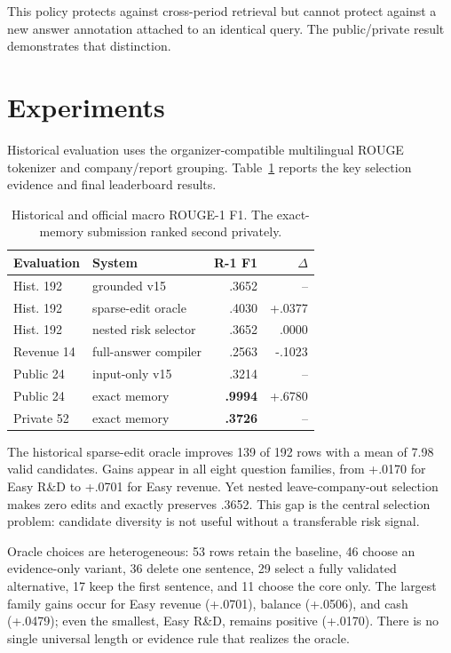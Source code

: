 \documentclass[11pt]{article}
\begin{document}
This policy protects against cross-period retrieval but cannot protect against a new answer annotation attached to an identical query. The public/private result demonstrates that distinction.

\section{Experiments}
Historical evaluation uses the organizer-compatible multilingual ROUGE tokenizer and company/report grouping. Table~\ref{tab:t3} reports the key selection evidence and final leaderboard results.

\begin{table}[t]
\centering
\small
\setlength{\tabcolsep}{3.5pt}
\begin{tabular}{@{}llrr@{}}
\toprule
Evaluation & System & R-1 F1 & $\Delta$ \\
\midrule
Hist. 192 & grounded v15 & .3652 & -- \\
Hist. 192 & sparse-edit oracle & .4030 & +.0377 \\
Hist. 192 & nested risk selector & .3652 & .0000 \\
Revenue 14 & full-answer compiler & .2563 & -.1023 \\
Public 24 & input-only v15 & .3214 & -- \\
Public 24 & exact memory & \textbf{.9994} & +.6780 \\
Private 52 & exact memory & \textbf{.3726} & -- \\
\bottomrule
\end{tabular}
\caption{Historical and official macro ROUGE-1 F1. The exact-memory submission ranked second privately.}
\label{tab:t3}
\end{table}

The historical sparse-edit oracle improves 139 of 192 rows with a mean of 7.98 valid candidates. Gains appear in all eight question families, from +.0170 for Easy R\&D to +.0701 for Easy revenue. Yet nested leave-company-out selection makes zero edits and exactly preserves .3652. This gap is the central selection problem: candidate diversity is not useful without a transferable risk signal.

Oracle choices are heterogeneous: 53 rows retain the baseline, 46 choose an
evidence-only variant, 36 delete one sentence, 29 select a fully validated
alternative, 17 keep the first sentence, and 11 choose the core only.  The
largest family gains occur for Easy revenue (+.0701), balance (+.0506), and cash
(+.0479); even the smallest, Easy R\&D, remains positive (+.0170).  There is no
single universal length or evidence rule that realizes the oracle.
\end{document}
